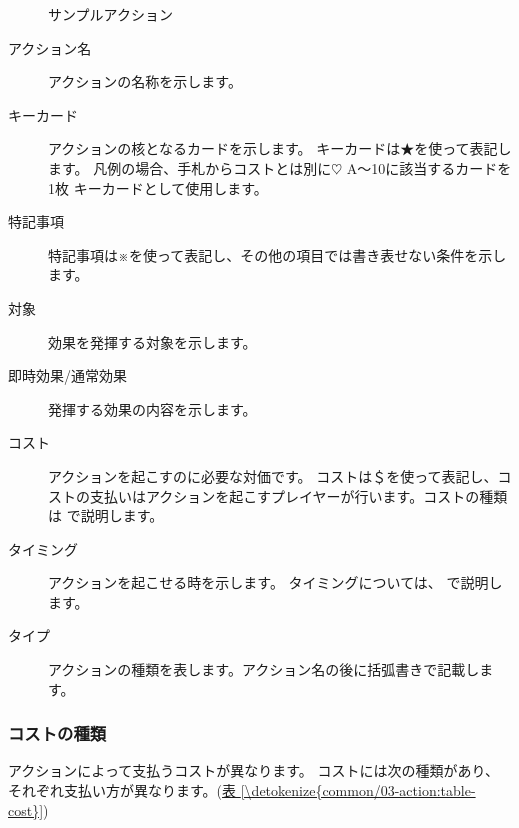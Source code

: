 \documentclass[letterpaper,10pt,dvipdfmx]{sphinxmanual}
\begin{document}
\begin{figure}[htbp]
\centering
\capstart

\noindent{}
\caption{サンプルアクション}\label{\detokenize{common/03-action:id32}}\label{\detokenize{common/03-action:action-sample}}\end{figure}
\begin{description}
\item[{アクション名}] \leavevmode
アクションの名称を示します。

\item[{キーカード}] \leavevmode
アクションの核となるカードを示します。
キーカードは★を使って表記します。
凡例の場合、手札からコストとは別に{\normalsize $\heartsuit$} A〜10に該当するカードを1枚
キーカードとして使用します。

\item[{特記事項}] \leavevmode
特記事項は※を使って表記し、その他の項目では書き表せない条件を示します。

\item[{対象}] \leavevmode
効果を発揮する対象を示します。

\item[{即時効果/通常効果}] \leavevmode
発揮する効果の内容を示します。

\item[{コスト}] \leavevmode
アクションを起こすのに必要な対価です。
コストは＄を使って表記し、コストの支払いはアクションを起こすプレイヤーが行います。コストの種類は {\hyperref[\detokenize{common/03-action:cost}]{}} で説明します。

\item[{タイミング}] \leavevmode
アクションを起こせる時を示します。
タイミングについては、 {\hyperref[\detokenize{common/03-action:action-chance}]{}} で説明します。

\item[{タイプ}] \leavevmode
アクションの種類を表します。アクション名の後に括弧書きで記載します。

\end{description}


\subsubsection{コストの種類}
\label{\detokenize{common/03-action:cost}}\label{\detokenize{common/03-action:id3}}
アクションによって支払うコストが異なります。
コストには次の種類があり、それぞれ支払い方が異なります。(\hyperref[\detokenize{common/03-action:table-cost}]{表 \ref{\detokenize{common/03-action:table-cost}}})
\end{document}
